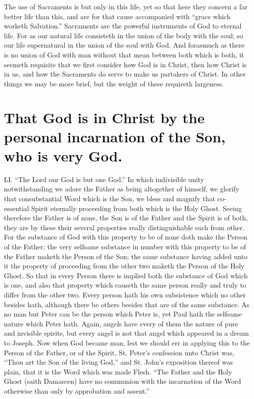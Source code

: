 The use of Sacraments is but only in this life, yet so that here they concern a far better life than this, and are for that cause accompanied with “grace which worketh Salvation.” Sacraments are the powerful instruments of God to eternal life. For as our natural life consisteth in the union of the body with the soul; so our life supernatural in the union of the soul with God. And forasmuch as there is no union of God with man without that mean between both which is both, it seemeth requisite that we first consider how God is in Christ, then how Christ is in us, and how the Sacraments do serve to make us partakers of Christ. In other things we may be more brief, but the weight of these requireth largeness.

\section*{That God is in Christ by the personal incarnation of the Son, who is very God.}
LI. “The Lord our God is but one God.” In which indivisible unity notwithstanding we adore the Father as being altogether of himself, we glorify that consubstantial Word which is the Son, we bless and magnify that co-essential Spirit eternally proceeding from both which is the Holy Ghost. Seeing therefore the Father is of none, the Son is of the Father and the Spirit is of both, they are by these their several properties really distinguishable each from other. For the substance of God with this property to be of none doth make the Person of the Father; the very selfsame substance in number with this property to be of the Father maketh the Person of the Son; the same substance having added unto it the property of proceeding from the other two maketh the Person of the Holy Ghost. So that in every Person there is implied both the substance of God which is one, and  also that property which causeth the same person really and truly to differ from the other two. Every person hath his own subsistence which no other besides hath, although there be others besides that are of the same substance. As no man but Peter can be the person which Peter is, yet Paul hath the selfsame nature which Peter hath. Again, angels have every of them the nature of pure and invisible spirits, but every angel is not that angel which appeared in a dream to Joseph.
Now when God became man, lest we should err in applying this to the Person of the Father, or of the Spirit, St. Peter’s confession unto Christ was, “Thou art the Son of the living God,” and St. John’s exposition thereof was plain, that it is the Word which was made Flesh. “The Father and the Holy Ghost (saith Damascen) have no communion with the incarnation of the Word otherwise than only by approbation and assent.”
